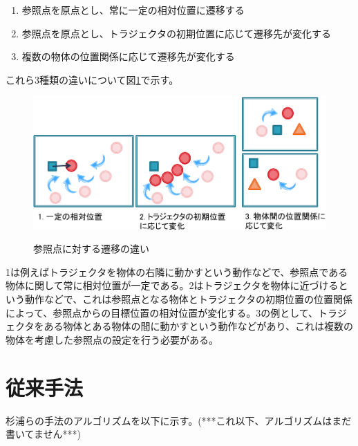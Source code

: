 	\begin{enumerate}
		\item 参照点を原点とし、常に一定の相対位置に遷移する
		\item 参照点を原点とし、トラジェクタの初期位置に応じて遷移先が変化する
		\item 複数の物体の位置関係に応じて遷移先が変化する
	\end{enumerate}
これら3種類の違いについて図\ref{figure:difference_displacement}で示す。
	\begin{figure}[t]
		\begin{center}
			\includegraphics[width=14cm]{figure2.png} \\ %
			\caption{参照点に対する遷移の違い}
			\label{figure:difference_displacement}
		\end{center}
	\end{figure}
1は例えばトラジェクタを物体の右隣に動かすという動作などで、参照点である物体に関して常に相対位置が一定である。2はトラジェクタを物体に近づけるという動作などで、これは参照点となる物体とトラジェクタの初期位置の位置関係によって、参照点からの目標位置の相対位置が変化する。3の例として、トラジェクタをある物体とある物体の間に動かすという動作などがあり、これは複数の物体を考慮した参照点の設定を行う必要がある。

\section{従来手法}

杉浦ら\cite{sugiura}の手法のアルゴリズムを以下に示す。(***これ以下、アルゴリズムはまだ書いてません***)

